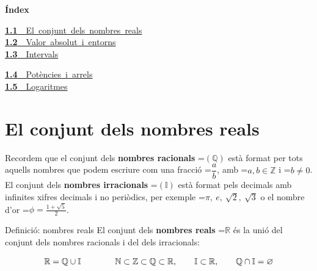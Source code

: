 \documentclass[11pt,a4paper]{article}
\newcommand{\fmm}[1]{\setbox0=\hbox{$#1$}\ifdim\wd0>\linewidth\fmdisp{#1}\else\mbox{\box0}\fi}
\newcommand{\fmdisp}[1]{\[\setbox2=\hbox{$\displaystyle #1$}\ifdim\wd2>\linewidth\resizebox{\linewidth}{!}{\box2}\else\box2\fi\]}
\begin{document}
\begin{tcolorbox}[colback=fmsurface,colframe=fmsurface,arc=3mm,left=4mm,right=4mm,top=2mm,bottom=2mm]
\small\textbf{Índex}\par\smallskip
\begin{minipage}[t]{0.49\linewidth}\small \mbox{\hyperlink{sec1}{\textbf{\color{fmgreen}1.1}\ \ El conjunt dels nombres reals}}\\[3pt]
\mbox{\hyperlink{sec2}{\textbf{\color{fmgreen}1.2}\ \ Valor absolut i entorns}}\\[3pt]
\mbox{\hyperlink{sec3}{\textbf{\color{fmgreen}1.3}\ \ Intervals}}\\[3pt]\end{minipage}\hfill\begin{minipage}[t]{0.49\linewidth}\small \mbox{\hyperlink{sec4}{\textbf{\color{fmgreen}1.4}\ \ Potències i arrels}}\\[3pt]
\mbox{\hyperlink{sec5}{\textbf{\color{fmgreen}1.5}\ \ Logaritmes}}\\[3pt]\end{minipage}
\end{tcolorbox}

\section{El conjunt dels nombres reals}\hypertarget{sec1}{}

Recordem que el conjunt dels \textbf{nombres racionals} \fmm{(\mathbb Q)} està format per tots aquells nombres que podem escriure com una fracció \fmm{\dfrac ab}, amb \fmm{a,b\in\mathbb Z} i \fmm{b\neq0}. El conjunt dels \textbf{nombres irracionals} \fmm{(\mathbb I)} està format pels decimals amb infinites xifres decimals i no periòdics, per exemple \fmm{\pi,\ e,\ \sqrt2,\ \sqrt3} o el nombre d'or \fmm{\phi=\frac{1+\sqrt5}{2}}.

\begin{fmdef}{Definició: nombres reals}
El conjunt dels \textbf{nombres reals} \fmm{\mathbb R} és la unió del conjunt dels nombres racionals i del dels irracionals:

\fmdisp{\mathbb R=\mathbb Q\cup\mathbb I\qquad\qquad \mathbb N\subset\mathbb Z\subset\mathbb Q\subset\mathbb R,\qquad \mathbb I\subset\mathbb R,\qquad \mathbb Q\cap\mathbb I=\varnothing}

\end{fmdef}

\end{document}
